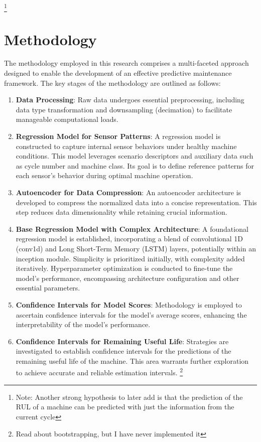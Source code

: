 \documentclass{IEEEtran}
\begin{document}
        \footnote{Note: Another strong hypothesis to later add is that the prediction of the RUL of a machine can be predicted with just the information from the current cycle}

    \section{Methodology}

        The methodology employed in this research comprises a multi-faceted approach designed to enable the development of an effective predictive maintenance framework. The key stages of the methodology are outlined as follows:
        \begin{enumerate}
            \item \textbf{Data Processing}: Raw data undergoes essential preprocessing, including data type transformation and downsampling (decimation) to facilitate manageable computational loads.
            \item \textbf{Regression Model for Sensor Patterns}: A regression model is constructed to capture internal sensor behaviors under healthy machine conditions. This model leverages scenario descriptors and auxiliary data such as cycle number and machine class. Its goal is to define reference patterns for each sensor's behavior during optimal machine operation.
            \item \textbf{Autoencoder for Data Compression}: An autoencoder architecture is developed to compress the normalized data into a concise representation. This step reduces data dimensionality while retaining crucial information.
            \item \textbf{Base Regression Model with Complex Architecture}: A foundational regression model is established, incorporating a blend of convolutional 1D (conv1d) and Long Short-Term Memory (LSTM) layers, potentially within an inception module. Simplicity is prioritized initially, with complexity added iteratively. Hyperparameter optimization is conducted to fine-tune the model's performance, encompassing architecture configuration and other essential parameters.
            \item \textbf{Confidence Intervals for Model Scores}: Methodology is employed to ascertain confidence intervals for the model's average scores, enhancing the interpretability of the model's performance.
            \item \textbf{Confidence Intervals for Remaining Useful Life}: Strategies are investigated to establish confidence intervals for the predictions of the remaining useful life of the machine. This area warrants further exploration to achieve accurate and reliable estimation intervals. \footnote{Read about bootstrapping, but I have never implemented it}
        \end{enumerate}
\end{document}
